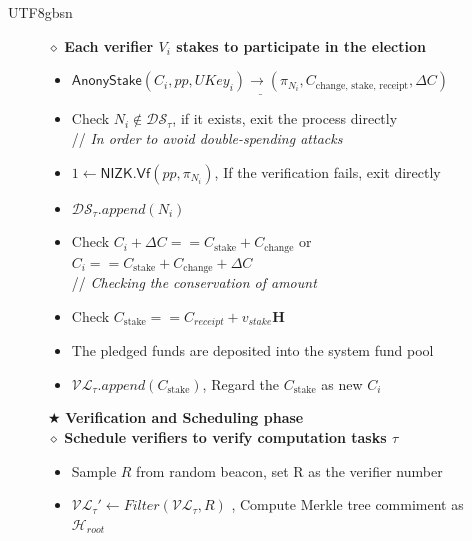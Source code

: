 \documentclass[runningheads]{llncs}
\newcommand{\nizkvf}{\mathsf{NIZK.Vf}}
\begin{document}
\begin{CJK*}{UTF8}{gbsn}
\begin{figure}[h!]
{{$\diamond$    \textbf{Each verifier $V_i$ stakes to participate in the election}
\vspace{-8pt}
    \begin{itemize}

        \item $\underline{ \mathsf{AnonyStake}(C_i, pp, UKey_i)  \rightarrow (\pi_{N_i}, C_{\text{change, stake, receipt}},\Delta C) } $
        
        \item Check $N_i \notin \mathcal{DS_\tau}$, if it exists, exit the process directly \\
        \textcolor{mygray}{\footnotesize // \emph{In order to avoid double-spending attacks}}
        \item $ 1 \leftarrow \nizkvf(pp, \pi_{N_i}) $, If the verification fails, exit directly
        \item $\mathcal{DS_\tau}.append(N_i)$
        \item Check $ C_i + \Delta C == C_{\text{stake}} + C_{\text{change}} $ or $C_i == C_{\text{stake}} + C_{\text{change}} + \Delta C $ \\
        \textcolor{mygray}{\footnotesize // \emph{Checking the conservation of amount}}

        \item Check $C_{\text{stake}} == C_{receipt} + v_{stake} \mathbf{H}$

        \item The pledged funds are deposited into the system fund pool
        \item $\mathcal{VL}_\tau.append(C_{\text{stake}})$, Regard the $C_{\text{stake}}$ as new $C_i$
    \end{itemize}
\vspace{-8pt}
    
$\bigstar$     \textbf{Verification and Scheduling phase} \\   
$\diamond$    \textbf{Schedule verifiers to verify computation tasks $\tau$ }   
\vspace{-8pt}
    \begin{itemize}
        \item Sample $R$ from random beacon, set R as the verifier number
        \item $\mathcal{VL}_\tau' \leftarrow Filter(\mathcal{VL}_\tau, R)$ , Compute Merkle tree commiment as $\mathcal{H}_{root}$
    \end{itemize}

}}
\end{figure}
\end{CJK*}
\end{document}
